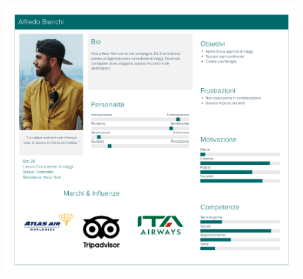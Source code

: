 \documentclass{natourDoc}
\begin{document}
\begin{figure}[!htbp]
	\centering
	\includegraphics[width=\textwidth]{./personas/personas-bianchi.pdf}
\end{figure}

\newpage

\end{document}
